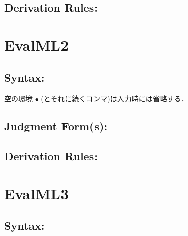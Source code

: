 \documentclass[11pt]{jarticle}
\begin{document}
\subsection*{Derivation Rules:}
\EvalMLiErrDisplayRules

\newpage

\section*{EvalML2}



\subsection*{Syntax:}

\EvalMLiiDisplayBNF

空の環境 \(\bullet\) (とそれに続くコンマ)は入力時には省略する．

\subsection*{Judgment Form(s):}


\subsection*{Derivation Rules:}
\EvalMLiiDisplayRules

\newpage

\section*{EvalML3}



\subsection*{Syntax:}
\end{document}
